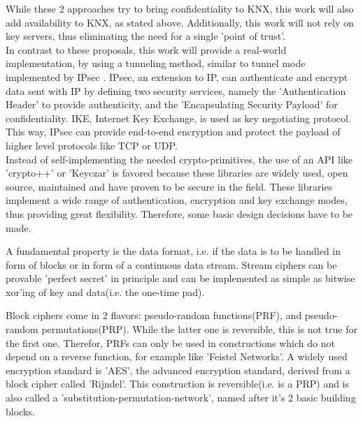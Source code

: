 \documentclass[a4paper,12pt,twoside]{memoir}
\begin{document}
While these 2 approaches try to bring confidentiality to KNX, this work will also add availability to KNX, as stated 
above. Additionally, this work will not rely on key servers, thus eliminating the need for a single 'point of trust'.
\\
In contrast to these proposals, this work will provide a real-world implementation, by using a tunneling method, similar to tunnel mode implemented by IPsec \cite{rfc4301}.
IPsec, an extension to IP, can authenticate and encrypt data sent with IP by defining two security services,
namely the 'Authentication Header' to provide authenticity, and the 'Encapsulating Security Payload' for confidentiality. IKE, Internet
Key Exchange, is used as key negotiating protocol. This way,
IPsec can provide end-to-end encryption and protect the payload of higher level protocols like TCP or UDP. 
\\
Instead of self-implementing the needed crypto-primitives, the use of an API like 'crypto++' or 'Keyczar'
is favored because these libraries are widely used, open source, maintained and have proven to be secure
in the field. These libraries implement a wide range of authentication, encryption and key exchange modes, thus
providing great flexibility. Therefore, some basic design decisions have to be made.

 A fundamental property is the data format, i.e. if the data is to be handled in form of blocks or in form of a continuous
 data stream. Stream ciphers can be provable 'perfect secret' in principle
 and can be implemented as simple as bitwise xor'ing of key and data(i.e. the one-time pad). 
 
 Block ciphers come in 2 flavors: pseudo-random functions(PRF), and pseudo-random permutations(PRP). While the latter one is reversible,
 this is not true for the first one. Therefor, PRFs can only be used in constructions which do not depend on a reverse function, for
 example like 'Feistel Networks'. A widely used encryption standard is 'AES', the advanced encryption standard, derived from a block cipher
 called 'Rijndel'.
 This construction is reversible(i.e. is a PRP) and is also called a 'substitution-permutation-network', named after it's 2 basic building blocks.
 
\end{document}
